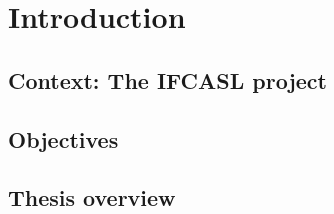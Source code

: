 %
%
\chapter{Introduction}
\label{chap:intro}


\blindtext 



\section{Context: The IFCASL project}
\blindtext
\section{Objectives}
\blindtext
\section{Thesis overview}
\blindtext


